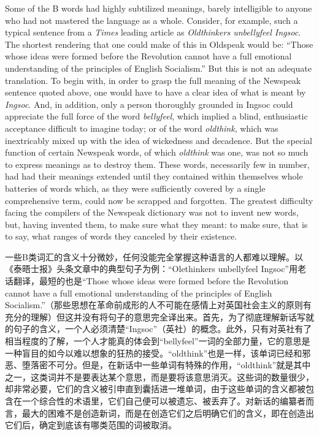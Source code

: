 \begin{paracol}{2}
Some of the B words had highly subtilized meanings, barely intelligible
to anyone who had not mastered the language as a whole. Consider, for
example, such a typical sentence from a \emph{Times} leading article as
\emph{Oldthinkers unbellyfeel Ingsoc}. The shortest rendering that one
could make of this in Oldspeak would be: ``Those whose ideas were formed
before the Revolution cannot have a full emotional understanding of the
principles of English Socialism.'' But this is not an adequate
translation. To begin with, in order to grasp the full meaning of the
Newspeak sentence quoted above, one would have to have a clear idea of
what is meant by \emph{Ingsoc}. And, in addition, only a person
thoroughly grounded in Ingsoc could appreciate the full force of the
word \emph{bellyfeel}, which implied a blind, enthusiastic acceptance
difficult to imagine today; or of the word \emph{oldthink}, which was
inextricably mixed up with the idea of wickedness and decadence. But the
special function of certain Newspeak words, of which \emph{oldthink} was
one, was not so much to express meanings as to destroy them. These
words, necessarily few in number, had had their meanings extended until
they contained within themselves whole batteries of words which, as they
were sufficiently covered by a single comprehensive term, could now be
scrapped and forgotten. The greatest difficulty facing the compilers of
the Newspeak dictionary was not to invent new words, but, having
invented them, to make sure what they meant: to make sure, that is to
say, what ranges of words they canceled by their existence.

\switchcolumn

一些B类词汇的含义十分微妙，任何没能完全掌握这种语言的人都难以理解。以《泰晤士报》头条文章中的典型句子为例：``Olethinkers
unbellyfeel Ingsoc''用老话翻译，最短的也是``Those whose ideas were
formed before the Revolution cannot have a full emotional understanding
of the principles of English
Socialism.''（那些思想在革命前成形的人不可能在感情上对英国社会主义的原则有充分的理解）但这并没有将句子的意思完全译出来。首先，为了彻底理解新话写就的句子的含义，一个人必须清楚``Ingsoc''（英社）的概念。此外，只有对英社有了相当程度的了解，一个人才能真的体会到``bellyfeel''一词的全部力量，它的意思是一种盲目的如今以难以想象的狂热的接受。``oldthink''也是一样，该单词已经和邪恶、堕落密不可分。但是，在新话中一些单词有特殊的作用，``oldthink''就是其中之一，这类词并不是要表达某个意思，而是要将该意思消灭。这些词的数量很少，却非常必要，它们的含义被引申直到囊括进一堆单词，由于这些单词的含义都被包含在一个综合性的术语里，它们自己便可以被遗忘、被丢弃了。对新话的编纂者而言，最大的困难不是创造新词，而是在创造它们之后明确它们的含义，即在创造出它们后，确定到底该有哪类范围的词被取消。


\end{paracol}
